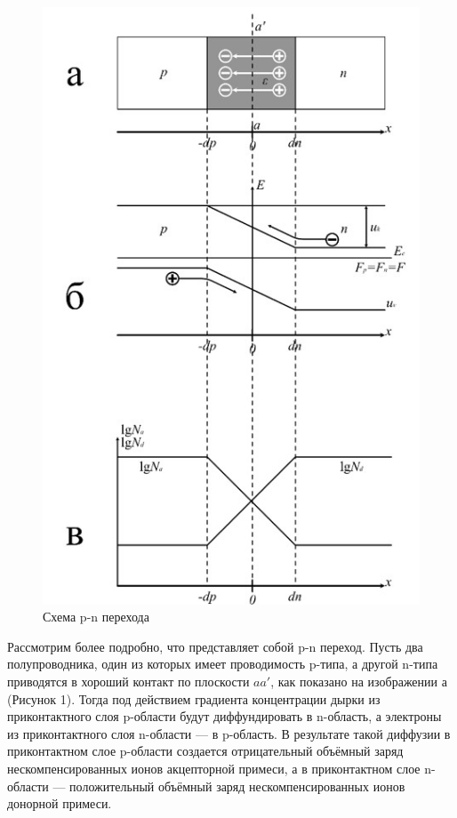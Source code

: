 \documentclass[a4paper,12pt]{article} %
\begin{document}
\begin{figure}[h!]
    \centering
    \includegraphics[scale=0.5]{1.1.jpg}
    \caption{Схема p-n перехода}
\end{figure}

Рассмотрим более подробно, что представляет собой p-n переход. Пусть два полупроводника, один из которых имеет проводимость p-типа, а другой n-типа приводятся в хороший контакт по плоскости $aa'$, как показано на изображении а (Рисунок 1). Тогда под действием градиента концентрации дырки из приконтактного слоя p-области будут диффундировать в n-область, а электроны из приконтактного слоя n-области — в p-область. В результате такой диффузии в приконтактном слое p-области создается отрицательный объёмный заряд нескомпенсированных ионов акцепторной примеси, а в приконтактном слое n-области — положительный объёмный заряд нескомпенсированных ионов донорной примеси. 
\end{document}
